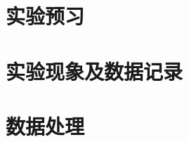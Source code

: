 \documentclass[signature=data]{physicsreport}
\begin{document}
\maketitle
\section{实验预习}
\newpage

\section{实验现象及数据记录}
\makeatletter
{}
\makeatother

\newpage



\section{数据处理}
\end{document}
